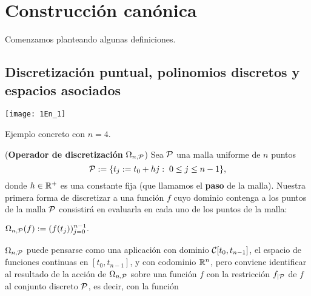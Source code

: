 \section{Construcción canónica}

Comenzamos planteando algunas definiciones.

\subsection{Discretización puntual, polinomios discretos y espacios asociados}
\label{discretizacion puntual, polinomios discretos y espacios asociados}

\begin{marginfigure}
\texttt{[image: 1En\_1]} 
		\caption{Ejemplo concreto con $n=4$.}
\end{marginfigure}


\begin{defi}
\label{def: operador de discretizacion puntual}
(\textbf{Operador de discretización} $\Omega_{n,\mathcal{P}}$)
Sea $\mathcal{P}$ una malla uniforme 
de $n$ puntos
\[
\mathcal{P}:=\{ t_{j}:=t_{0}+hj : \hspace{0.1cm} 0 \leq j \leq n-1 \},
\]
donde $h \in \mathbb{R}^{+}$ es una constante fija
(que llamamos el \textbf{paso} de la malla).
Nuestra primera forma de discretizar
a una función $f$ cuyo dominio contenga a los puntos
de la malla $\mathcal{P}$
consistirá en evaluarla en cada uno de los
puntos de la malla:


\begin{center}
$\Omega_{n,\mathcal{P}}(f) := (f(t_{j}))_{j=0}^{n-1}.$
\end{center}
\end{defi}



\noindent $\Omega_{n,\mathcal{P}}$
puede pensarse como una aplicación con dominio
$\mathcal{C}[t_{0}, t_{n-1}]$,
el espacio de funciones 
continuas en $[t_{0}, t_{n-1}]$,
y con codominio $\mathbb{R}^{n}$, pero conviene 
identificar al resultado 
de la acción de $\Omega_{n,\mathcal{P}}$ sobre una
función $f$ con la restricción $f_{| \mathcal{P}}$
de 
$f$ al conjunto discreto $\mathcal{P}$,
es decir, con la función

